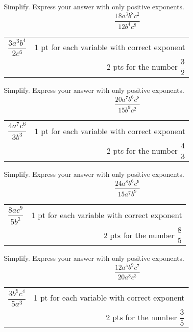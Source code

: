 {
	Simplify.  Express your answer with only positive exponents.  $$\dfrac{18a^3b^8c^2}{12b^4c^8}$$
}
{
	\begin{tabular}{l r}
	$\dfrac{3a^3b^4}{2c^6}$ &   1 pt for each variable with correct exponent \\
	& 2 pts for the number $\dfrac{3}{2}$
	\end{tabular}
}

{
	Simplify.  Express your answer with only positive exponents.  $$\dfrac{20a^7b^6c^8}{15b^{9}c^2}$$
}
{
	\begin{tabular}{l r}
	$\dfrac{4a^7c^{6}}{3b^3}$ &   1 pt for each variable with correct exponent \\
	& 2 pts for the number $\dfrac{4}{3}$
	\end{tabular}
}

{
	Simplify.  Express your answer with only positive exponents.  $$\dfrac{24a^8b^6c^9}{15a^7b^9}$$
}
{
	\begin{tabular}{l r}
	$\dfrac{8ac^9}{5b^3}$ &   1 pt for each variable with correct exponent \\
	& 2 pts for the number $\dfrac{8}{5}$
	\end{tabular}
}

{
	Simplify.  Express your answer with only positive exponents.  $$\dfrac{12a^5b^9c^7}{20a^{8}c^3}$$
}
{
	\begin{tabular}{l r}
	$\dfrac{3b^9c^4}{5a^3}$ &   1 pt for each variable with correct exponent \\
	& 2 pts for the number $\dfrac{3}{5}$
	\end{tabular}
}
